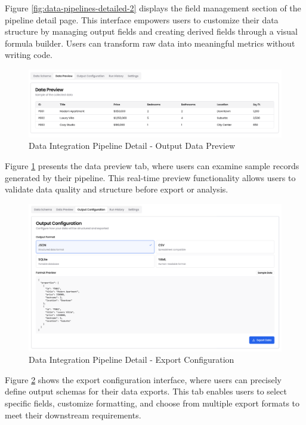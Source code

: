 Figure \ref{fig:data-pipelines-detailed-2} displays the field management section of the pipeline detail page. This interface empowers users to customize their data structure by managing output fields and creating derived fields through a visual formula builder. Users can transform raw data into meaningful metrics without writing code.

\begin{figure}[h]
\centering
\includegraphics[width=1\textwidth]{assets/ui/data-pipelines-detailed-data-preview.png}
\caption{Data Integration Pipeline Detail - Output Data Preview}
\label{fig:data-pipelines-detailed-data-preview}
\end{figure}

Figure \ref{fig:data-pipelines-detailed-data-preview} presents the data preview tab, where users can examine sample records generated by their pipeline. This real-time preview functionality allows users to validate data quality and structure before export or analysis.

\pagebreak
\begin{figure}[h]
\centering
\includegraphics[width=1\textwidth]{assets/ui/data-pipelines-detailed-export-data.png}
\caption{Data Integration Pipeline Detail - Export Configuration}
\label{fig:data-pipelines-detailed-export-data}
\end{figure}

Figure \ref{fig:data-pipelines-detailed-export-data} shows the export configuration interface, where users can precisely define output schemas for their data exports. This tab enables users to select specific fields, customize formatting, and choose from multiple export formats to meet their downstream requirements.

